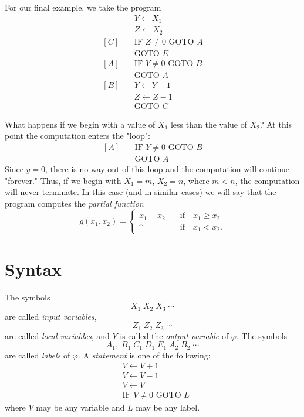 \documentclass[a4paper,10pt,twoside]{book}
\begin{document}
For our final example, we take the program
\begin{equation*}
    \begin{aligned}&Y\leftarrow X_{1}\\ &Z\leftarrow X_{2}\\ [C]\quad&\text{IF }Z\neq0\text{ GOTO }A\\ &\text{GOTO }E\\ [A]\quad&\text{IF }Y\neq0\text{ GOTO }B\\ &\text{GOTO }A\\ [B]\quad&Y\leftarrow Y-1\\ &Z\leftarrow Z-1\\ &\text{GOTO }C\end{aligned}
\end{equation*}

What happens if we begin with a value of $X_1$ less than the value of $X_2$? At this point the computation enters the "loop":
\begin{equation*}
    \begin{aligned}[A]\quad&\text{IF }Y\neq 0\text{ GOTO }B\\&\text{GOTO }A\end{aligned}
\end{equation*}
Since $y=0$, there is no way out of this loop and the computation will continue "forever." Thus, if we begin with $X_1=m$, $X_2=n$, where $m<n$, the computation will never terminate. In this case (and in similar cases) we will say that the program computes the \textit{partial function} $$g(x_1,x_2)=\begin{cases}x_1-x_2&\quad\text{if}\quad x_1\geq x_2\\\uparrow&\quad\text{if}\quad x_1<x_2.\end{cases}$$

\section{Syntax}

The symbols $$X_1\;X_2\;X_3\;\cdots$$ are called \textit{input variables}, $$Z_1\;Z_2\;Z_3\;\cdots$$ are called \textit{local variables}, and $Y$ is called the \textit{output variable} of $\varphi$. The symbols $$A_1,\;B_1\;C_1\;D_1\;E_1\;A_2\;B_2\;\cdots$$ are called \textit{labels} of $\varphi$. A \textit{statement} is one of the following:
\begin{equation*}
    \begin{aligned}&V\leftarrow V+1\\&V\leftarrow V-1\\&V\leftarrow V\\&\text{IF }V\neq 0\text{ GOTO }L\end{aligned}
\end{equation*}
where $V$ may be any variable and $L$ may be any label.
\end{document}
